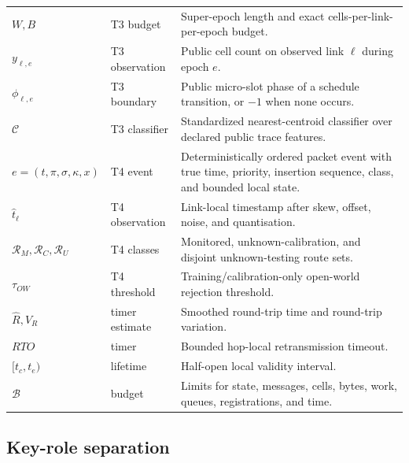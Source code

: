 \documentclass[11pt,oneside]{article}
\begin{document}
\begin{longtable}{@{}p{}p{}p{}@{}}
$W,B$ & T3 budget & Super-epoch length and exact cells-per-link-per-epoch budget. \\
$y_{\ell,e}$ & T3 observation & Public cell count on observed link $\ell$ during epoch $e$. \\
$\phi_{\ell,e}$ & T3 boundary & Public micro-slot phase of a schedule transition, or $-1$ when none occurs. \\
$\mathcal{C}$ & T3 classifier & Standardized nearest-centroid classifier over declared public trace features. \\
$e=(t,\pi,\sigma,\kappa,x)$ & T4 event & Deterministically ordered packet event with true time, priority, insertion sequence, class, and bounded local state. \\
$\widehat t_\ell$ & T4 observation & Link-local timestamp after skew, offset, noise, and quantisation. \\
$\mathcal R_M,\mathcal R_C,\mathcal R_U$ & T4 classes & Monitored, unknown-calibration, and disjoint unknown-testing route sets. \\
$\tau_{OW}$ & T4 threshold & Training/calibration-only open-world rejection threshold. \\
$\widehat R,V_R$ & timer estimate & Smoothed round-trip time and round-trip variation. \\
$RTO$ & timer & Bounded hop-local retransmission timeout. \\
$[t_c,t_e)$ & lifetime & Half-open local validity interval. \\
$\mathcal B$ & budget & Limits for state, messages, cells, bytes, work, queues, registrations, and time. \\
\bottomrule
\end{longtable}

\subsection{Key-role separation}
\end{document}
